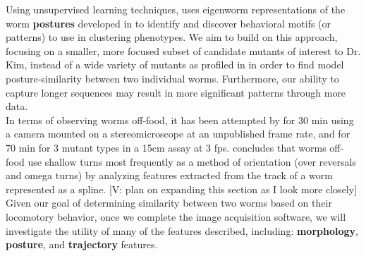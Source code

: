 \documentclass[main.tex]{subfiles}
\begin{document}
Using unsupervised learning techniques, \cite{brown2013} uses eigenworm representations of the worm \textbf{postures} developed in \cite{stephens2008} to identify and discover behavioral motifs (or patterns) to use in clustering phenotypes. We aim to build on this approach, focusing on a smaller, more focused subset of candidate mutants of interest to Dr. Kim, instead of a wide variety of mutants as profiled in \cite{yemini2013} in order to find model posture-similarity between two individual worms. Furthermore, our ability to capture longer sequences may result in more significant patterns through more data. \\ 

In terms of observing worms off-food, it has been attempted by \cite{kim2011} for 30 min using a camera mounted on a stereomicroscope at an unpublished frame rate, and \cite{hoshi2006} for 70 min for 3 mutant types in a 15cm assay at 3 fps. \cite{kim2011} concludes that worms off-food use shallow turns most frequently as a method of orientation (over reversals and omega turns) by analyzing features extracted from the track of a worm represented as a spline. [V: plan on expanding this section as I look more closely]\\

Given our goal of determining similarity between two worms based on their locomotory behavior, once we complete the image acquisition software, we will investigate the utility of many of the features described, including: \textbf{morphology}, \textbf{posture},  and \textbf{trajectory} features. \\
\end{document}
